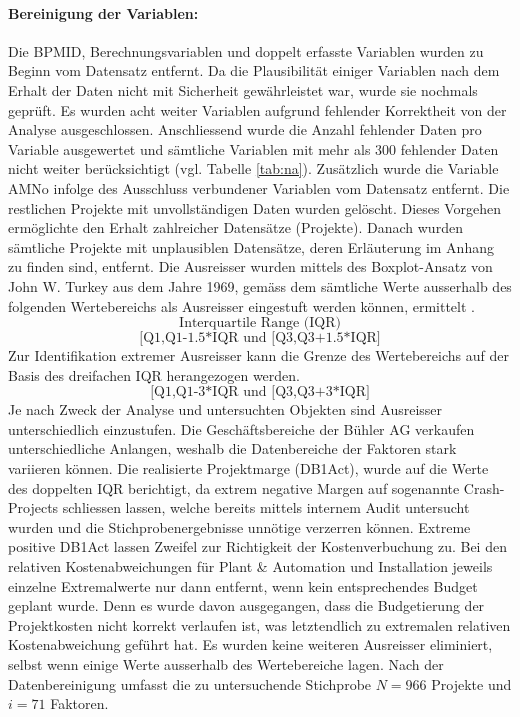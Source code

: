 \paragraph{Bereinigung der Variablen: }Die BPMID, Berechnungsvariablen und doppelt erfasste Variablen wurden zu Beginn vom Datensatz entfernt. Da die Plausibilität einiger Variablen nach dem Erhalt der Daten nicht mit Sicherheit gewährleistet war, wurde sie nochmals geprüft. Es wurden acht weiter Variablen aufgrund fehlender Korrektheit von der Analyse ausgeschlossen. Anschliessend wurde die Anzahl fehlender Daten pro Variable ausgewertet und sämtliche Variablen mit mehr als 300 fehlender Daten nicht weiter berücksichtigt (vgl. Tabelle \ref{tab:na}). Zusätzlich wurde die Variable AMNo infolge des Ausschluss verbundener Variablen vom Datensatz entfernt. Die restlichen Projekte mit unvollständigen Daten wurden gelöscht. Dieses Vorgehen ermöglichte den Erhalt zahlreicher Datensätze (Projekte).
\newline\newline
Danach wurden sämtliche Projekte mit unplausiblen Datensätze, deren Erläuterung im Anhang zu finden sind, entfernt. Die Ausreisser wurden mittels des Boxplot-Ansatz von John W. Turkey aus dem Jahre 1969, gemäss dem sämtliche Werte ausserhalb des folgenden Wertebereichs als Ausreisser eingestuft werden können, ermittelt \citep{lifengli16}.
\begin{equation*}
\text{Interquartile Range (IQR)}
\end{equation*}
\begin{equation*}
\text{[Q1,Q1-1.5*IQR und [Q3,Q3+1.5*IQR]}
\end{equation*}
Zur Identifikation extremer Ausreisser kann die Grenze des Wertebereichs auf der Basis des dreifachen IQR herangezogen werden.
\begin{equation*}
\text{[Q1,Q1-3*IQR und [Q3,Q3+3*IQR]}
\end{equation*}
Je nach Zweck der Analyse und untersuchten Objekten sind Ausreisser unterschiedlich einzustufen. Die Geschäftsbereiche der Bühler AG verkaufen unterschiedliche Anlangen, weshalb die Datenbereiche der Faktoren stark variieren können. Die realisierte Projektmarge (DB1Act), wurde auf die Werte des doppelten IQR berichtigt, da extrem negative Margen auf sogenannte Crash-Projects schliessen lassen, welche bereits mittels internem Audit untersucht wurden und die Stichprobenergebnisse unnötige verzerren können. Extreme positive DB1Act lassen Zweifel zur Richtigkeit der Kostenverbuchung zu. Bei den relativen Kostenabweichungen für Plant \& Automation und Installation jeweils einzelne Extremalwerte nur dann entfernt, wenn kein entsprechendes Budget geplant wurde. Denn es wurde davon ausgegangen, dass die Budgetierung der Projektkosten nicht korrekt verlaufen ist, was letztendlich zu extremalen relativen Kostenabweichung geführt hat. Es wurden keine weiteren Ausreisser eliminiert, selbst wenn einige Werte ausserhalb des Wertebereiche lagen. Nach der Datenbereinigung umfasst die zu untersuchende Stichprobe $N = 966$ Projekte und $ i = 71$ Faktoren.
